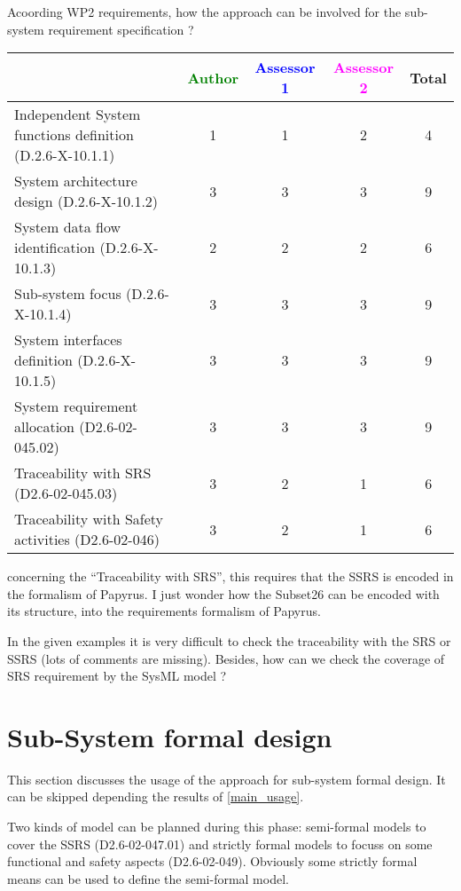Acoording WP2 requirements, how the approach can be involved for the sub-system requirement specification ?

\begin{tabular}{|l | c | c | c | c|}
\hline
& \textcolor{green}{Author} & \textcolor{blue}{Assessor 1} & \textcolor{magenta}{Assessor 2} & Total \\
\hline
Independent System functions definition (D.2.6-X-10.1.1) & 1 & 1 & 2 & 4 \\
\hline
System architecture design (D.2.6-X-10.1.2) & 3 & 3 & 3  & 9 \\
\hline
System data flow identification (D.2.6-X-10.1.3) & 2 & 2 & 2 & 6 \\
\hline
Sub-system focus (D.2.6-X-10.1.4) & 3 & 3 & 3 & 9 \\
\hline
System interfaces definition (D.2.6-X-10.1.5) & 3 & 3 & 3 &  9\\
\hline
System requirement allocation (D2.6-02-045.02) & 3 & 3 & 3 & 9 \\
\hline
Traceability with SRS (D2.6-02-045.03) & 3 & 2 & 1 & 6 \\
\hline
Traceability with Safety activities (D2.6-02-046) & 3 & 2 & 1 & 6 \\
\hline
\end{tabular}

\begin{assessor1}
concerning the "`Traceability with SRS"', this requires that the SSRS is encoded in the formalism of Papyrus. I just wonder how the Subset26 can be encoded with its structure, into the requirements formalism of Papyrus. 
\end{assessor1}


\begin{assessor2}
In the given examples it is very difficult to check the traceability with the SRS or SSRS (lots of comments are missing). Besides, how can we check the coverage of SRS requirement by the SysML model ?
\end{assessor2}



\section{Sub-System formal design}
This section discusses the usage of the approach for sub-system formal design.
It can be skipped depending the results of \ref{main_usage}.

Two kinds of model can be planned during this phase: semi-formal models to cover the SSRS (D2.6-02-047.01) and strictly formal models to focuss on some functional and safety aspects (D2.6-02-049). Obviously some strictly formal means can be used to define the semi-formal model.

